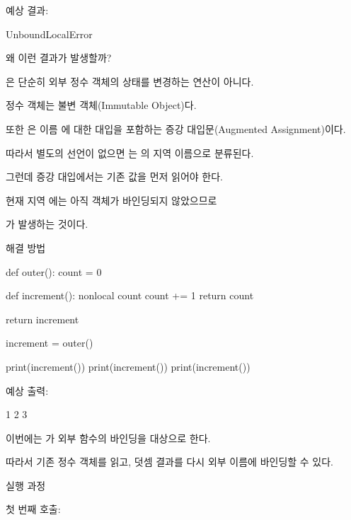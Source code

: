예상 결과:

\begin{dhkzsh}
UnboundLocalError
\end{dhkzsh}

왜 이런 결과가 발생할까?

은 단순히 외부 정수 객체의 상태를 변경하는 연산이 아니다.

정수 객체는 불변 객체(Immutable Object)다.

또한 은 이름 에 대한 대입을 포함하는 증강 대입문(Augmented Assignment)이다.

따라서 별도의  선언이 없으면 는 의 지역 이름으로 분류된다.

그런데 증강 대입에서는 기존 값을 먼저 읽어야 한다.

현재 지역 에는 아직 객체가 바인딩되지 않았으므로 

가 발생하는 것이다.

\begin{dhknote}
\begin{dhksmry}[centered]
해결 방법
\end{dhksmry}
\end{dhknote}

\begin{dhkcode}
def outer():
    count = 0

    def increment():
        nonlocal count
        count += 1
        return count

    return increment


increment = outer()

print(increment())
print(increment())
print(increment())
\end{dhkcode}

예상 출력:

\begin{dhkzsh}
1
2
3
\end{dhkzsh}

이번에는 가 외부 함수의 바인딩을 대상으로 한다.

따라서 기존 정수 객체를 읽고, 덧셈 결과를 다시 외부 이름에 바인딩할 수 있다.

\begin{dhknote}
\begin{dhksmry}[centered]
실행 과정
\end{dhksmry}
\end{dhknote}

첫 번째 호출:

